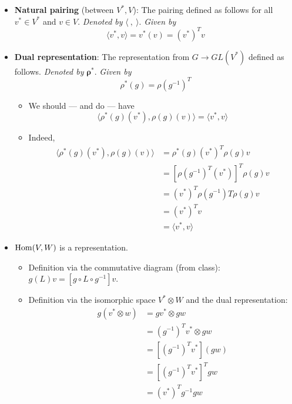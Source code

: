 \documentclass[../notes.tex]{subfiles}
\begin{document}
\begin{itemize}
    \item \textbf{Natural pairing} (between $V^*,V$): The pairing defined as follows for all $v^*\in V^*$ and $v\in V$. \emph{Denoted by} $\bm{\langle\ ,\ \rangle}$. \emph{Given by}
    \begin{equation*}
        \langle v^*,v \rangle = v^*(v) = (v^*)^Tv
    \end{equation*}
    \item \textbf{Dual representation}: The representation from $G\to GL(V^*)$ defined as follows. \emph{Denoted by} $\bm{\rho^*}$. \emph{Given by}
    \begin{equation*}
        \rho^*(g) = \rho(g^{-1})^T
    \end{equation*}
    \begin{itemize}
        \item We should --- and do --- have
        \begin{equation*}
            \langle \rho^*(g)(v^*),\rho(g)(v) \rangle = \langle v^*,v \rangle
        \end{equation*}
        \item Indeed,
        \begin{align*}
            \langle \rho^*(g)(v^*),\rho(g)(v) \rangle &= \rho^*(g)(v^*)^T\rho(g)v\\
            &= [\rho(g^{-1})^T(v^*)]^T\rho(g)v\\
            &= (v^*)^T\rho(g^{-1})T\rho(g)v\\
            &= (v^*)^Tv\\
            &= \langle v^*,v \rangle
        \end{align*}
    \end{itemize}
    \item $\operatorname{Hom}(V,W)$ is a representation.
    \begin{itemize}
        \item Definition via the commutative diagram (from class): $g(L)v=[g\circ L\circ g^{-1}]v$.
        \item Definition via the isomorphic space $V^*\otimes W$ and the dual representation:
        \begin{align*}
            g(v^*\otimes w) &= gv^*\otimes gw\\
            &= (g^{-1})^Tv^*\otimes gw\\
            &= [(g^{-1})^Tv^*](gw)\\
            &= [(g^{-1})^Tv^*]^Tgw\\
            &= (v^*)^Tg^{-1}gw\\

\end{align*}
\end{itemize}
\end{itemize}
\end{document}

